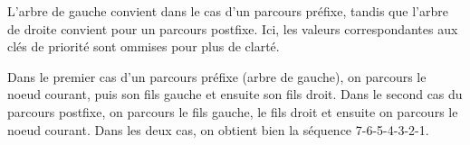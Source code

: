 \begin{itemize}
L'arbre de gauche convient dans le cas d'un parcours préfixe, tandis que l'arbre de droite convient pour un parcours postfixe. Ici, les valeurs correspondantes aux clés de priorité sont ommises pour plus de clarté.\newline

Dans le premier cas d'un parcours préfixe (arbre de gauche), on parcours le noeud courant, puis son fils gauche et ensuite son fils droit. Dans le second cas du parcours postfixe, on parcours le fils gauche, le fils droit et ensuite on parcours le noeud courant. Dans les deux cas, on obtient bien la séquence 7-6-5-4-3-2-1.

\end{itemize}
